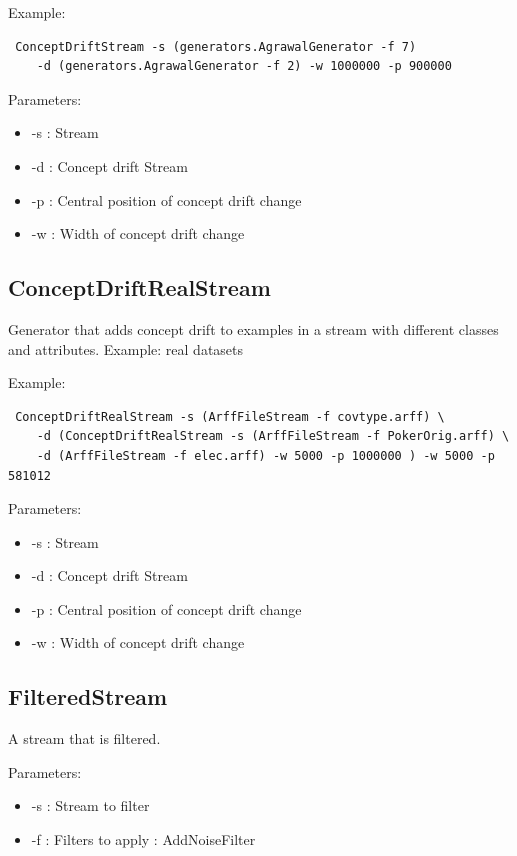 \documentclass[a4paper,12pt,twoside]{book}
\begin{document}
Example:
\begin{footnotesize}\begin{verbatim}
 ConceptDriftStream -s (generators.AgrawalGenerator -f 7) 
    -d (generators.AgrawalGenerator -f 2) -w 1000000 -p 900000 
\end{verbatim}\end{footnotesize}
Parameters:

\begin{itemize}
\item -s : Stream 
\item -d : Concept drift Stream
\item -p : Central position of concept drift change
\item -w : Width of concept drift change\end{itemize}


\subsection{ConceptDriftRealStream} Generator that adds concept drift to examples in a stream with 
 different classes and attributes. Example: real datasets

 Example:
\begin{footnotesize}
\begin{verbatim}               
 ConceptDriftRealStream -s (ArffFileStream -f covtype.arff) \
    -d (ConceptDriftRealStream -s (ArffFileStream -f PokerOrig.arff) \
    -d (ArffFileStream -f elec.arff) -w 5000 -p 1000000 ) -w 5000 -p 581012 
\end{verbatim} \end{footnotesize}
Parameters:

\begin{itemize}
\item -s : Stream 
\item -d : Concept drift Stream
\item -p : Central position of concept drift change
\item -w : Width of concept drift change\end{itemize}


\subsection{FilteredStream} A stream that is filtered.

Parameters:

\begin{itemize}
\item -s : Stream to filter 
\item -f : Filters to apply : AddNoiseFilter\end{itemize}
\end{document}
